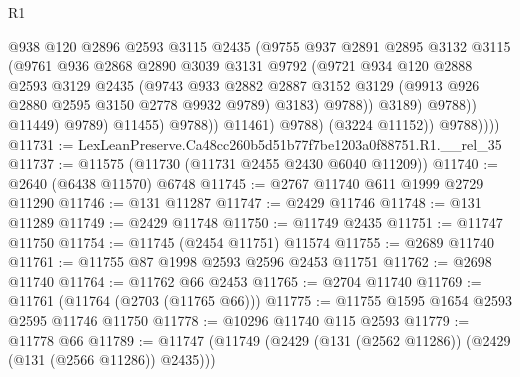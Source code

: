 \begin{lexlean}{R1}
\begin{coremodule}
                                @938
                                @120
                                @2896
                                @2593
                                @3115
                                @2435
                                (@9755
                                  @937
                                  @2891
                                  @2895
                                  @3132
                                  @3115
                                  (@9761
                                    @936
                                    @2868
                                    @2890
                                    @3039
                                    @3131
                                    @9792
                                    (@9721
                                      @934
                                      @120
                                      @2888
                                      @2593
                                      @3129
                                      @2435
                                      (@9743
                                        @933
                                        @2882
                                        @2887
                                        @3152
                                        @3129
                                        (@9913 @926 @2880 @2595 @3150 @2778 @9932 @9789)
                                        @3183)
                                      @9788))
                                  @3189)
                                @9788))
                            @11449)
                          @9789)
                        @11455)
                      @9788))
                  @11461)
                @9788)
              (@3224 @11152))
            @9788))))
@11731 := LexLeanPreserve.Ca48cc260b5d51b77f7be1203a0f88751.R1.__rel_35
@11737 := @11575 (@11730 (@11731 @2455 @2430 @6040 @11209))
@11740 := @2640 (@6438 @11570) @6748
@11745 := @2767 @11740 @611 @1999 @2729 @11290
@11746 := @131 @11287
@11747 := @2429 @11746
@11748 := @131 @11289
@11749 := @2429 @11748
@11750 := @11749 @2435
@11751 := @11747 @11750
@11754 := @11745 (@2454 @11751) @11574
@11755 := @2689 @11740
@11761 := @11755 @87 @1998 @2593 @2596 @2453 @11751
@11762 := @2698 @11740
@11764 := @11762 @66 @2453
@11765 := @2704 @11740
@11769 := @11761 (@11764 (@2703 (@11765 @66)))
@11775 := @11755 @1595 @1654 @2593 @2595 @11746 @11750
@11778 := @10296 @11740 @115 @2593
@11779 := @11778 @66
@11789 := @11747 (@11749 (@2429 (@131 (@2562 @11286)) (@2429 (@131 (@2566 @11286)) @2435)))

\end{coremodule}
\end{lexlean}
